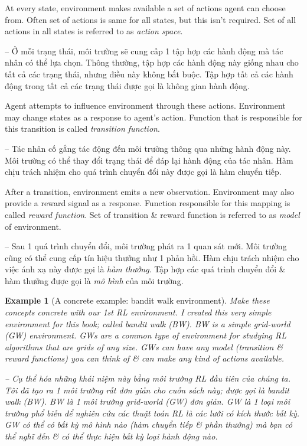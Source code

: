 \documentclass{article}
\newtheorem{example}{Example}
\begin{document}
\begin{itemize}
\begin{itemize}
\begin{itemize}
            At every state, environment makes available a set of actions agent can choose from. Often set of actions is same for all states, but this isn't required. Set of all actions in all states is referred to as {\it action space}.

            -- Ở mỗi trạng thái, môi trường sẽ cung cấp 1 tập hợp các hành động mà tác nhân có thể lựa chọn. Thông thường, tập hợp các hành động này giống nhau cho tất cả các trạng thái, nhưng điều này không bắt buộc. Tập hợp tất cả các hành động trong tất cả các trạng thái được gọi là không gian hành động.

            Agent attempts to influence environment through these actions. Environment may change states as a response to agent's action. Function that is responsible for this transition is called {\it transition function}.

            -- Tác nhân cố gắng tác động đến môi trường thông qua những hành động này. Môi trường có thể thay đổi trạng thái để đáp lại hành động của tác nhân. Hàm chịu trách nhiệm cho quá trình chuyển đổi này được gọi là hàm chuyển tiếp.

            After a transition, environment emits a new observation. Environment may also provide a reward signal as a response. Function responsible for this mapping is called {\it reward function}. Set of transition \& reward function is referred to as {\it model} of environment.

            -- Sau 1 quá trình chuyển đổi, môi trường phát ra 1 quan sát mới. Môi trường cũng có thể cung cấp tín hiệu thưởng như 1 phản hồi. Hàm chịu trách nhiệm cho việc ánh xạ này được gọi là {\it hàm thưởng}. Tập hợp các quá trình chuyển đổi \& hàm thưởng được gọi là {\it mô hình} của môi trường.

            \begin{example}[A concrete example: bandit walk environment]
                Make these concepts concrete with our 1st RL environment. I created this very simple environment for this book; called bandit walk (BW). BW is a simple {\rm grid-world} (GW) environment. GWs are a common type of environment for studying RL algorithms that are grids of any size. GWs can have any model (transition \& reward functions) you can think of \& can make any kind of actions available.

                -- Cụ thể hóa những khái niệm này bằng môi trường RL đầu tiên của chúng ta. Tôi đã tạo ra 1 môi trường rất đơn giản cho cuốn sách này; được gọi là bandit walk (BW). BW là 1 môi trường {\rm grid-world} (GW) đơn giản. GW là 1 loại môi trường phổ biến để nghiên cứu các thuật toán RL là các lưới có kích thước bất kỳ. GW có thể có bất kỳ mô hình nào (hàm chuyển tiếp \& phần thưởng) mà bạn có thể nghĩ đến \& có thể thực hiện bất kỳ loại hành động nào.


\end{example}
\end{itemize}
\end{itemize}
\end{itemize}
\end{document}
